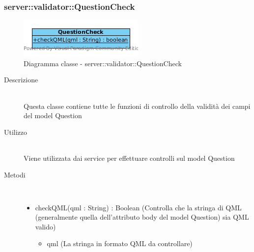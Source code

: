 \subsubsection[QuestionCheck]{server::validator::QuestionCheck}
\begin{center}
			\begin{figure}[H]
				\centering \includegraphics[scale=4, max width=\textwidth, max height=\myheight]{../img/diagrammiClassi/server/validator/QuestionCheck.png}
				\caption{Diagramma classe - server::validator::QuestionCheck}
			\end{figure}
		\end{center}\begin{description}
\item[Descrizione] \hfill \\
 Questa classe contiene tutte le funzioni di controllo della validità dei campi del model Question
\item[Utilizzo] \hfill \\
 Viene utilizzata dai service per effettuare controlli sul model Question
\item[Metodi] \hfill \\
 \vspace{-7mm}
\begin{itemize}
\item checkQML(qml : String) : Boolean (Controlla che la stringa di QML (generalmente quella dell'attributo body del model Question) sia QML valido)\begin{itemize}
\item qml (La stringa in formato QML da controllare)
\end{itemize}

\end{itemize}

\end{description}
